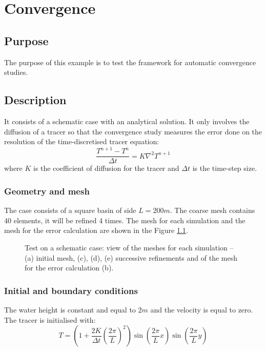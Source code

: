 \chapter{Convergence}

\section{Purpose}
The purpose of this example is to test the framework for automatic
convergence studies.

\section{Description}
It consists of a schematic case with an analytical solution.
It only involves the diffusion of a tracer so that the convergence study
measures the error done on the resolution of the time-discretised
tracer equation:
\begin{equation}
\dfrac{T^{n+1} - T^{n}}{\Delta t} = K \nabla^2 T^{n+1}
\end{equation}
where $K$ is the coefficient of diffusion for the tracer
and $\Delta t$ is the time-step size.

\subsection{Geometry and mesh}
The case consists of a square basin of side $L=200m$.
The coarse mesh contains 40 elements, it will be refined 4 times.
The mesh for each simulation and the mesh for
the error calculation are shown in the Figure \ref{fig:figure1}.

\begin{figure}
  \begin{center}
    \caption{Test on a schematic case: view of the meshes for each simulation
    -- (a) initial mesh, (c), (d), (e) successive refinements and
    of the mesh for the error calculation (b).}
    \label{fig:figure1}
  \end{center}
\end{figure}

\subsection{Initial and boundary conditions}
The water height is constant and equal to $2m$ and the velocity
is equal to zero.
The tracer is initialised with:
\begin{equation}
T = \left(1 + \dfrac{2 K}{\Delta t}\left(\dfrac{2 \pi}{L}\right)^2 \right)
\sin \left(\dfrac{2 \pi}{L}x \right)
\sin \left( \dfrac{2 \pi}{L}y\right)
\end{equation}


